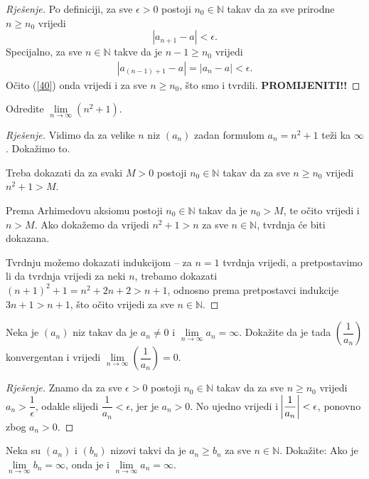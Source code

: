\begin{proof}[Rješenje]
Po definiciji, za sve $\epsilon>0$ postoji $n_0\in \mathbb{N}$ takav da za sve prirodne $n\geq n_0$ vrijedi $$|a_{n+1}-a|<\epsilon.$$ Specijalno, za sve $n\in \mathbb{N}$ takve da je $n-1\geq n_0$ vrijedi 
\begin{gather}
\label{40}
|a_{(n-1)+1}-a|=|a_n-a|<\epsilon.
\end{gather}
Očito (\ref{40}) onda vrijedi i za sve $n\geq n_0$, što smo i tvrdili. \textbf{PROMIJENITI!!}
\end{proof}
\begin{exercise}
Odredite $\lim\limits_{n\to \infty} \left(n^2+1\right)$.
\end{exercise}
\begin{proof}[Rješenje]
Vidimo da za velike $n$ niz $(a_n)$ zadan formulom $a_n=n^2+1$ teži ka $\infty$. Dokažimo to. 

Treba dokazati da za svaki $M>0$ postoji $n_0\in \mathbb{N}$ takav da za sve $n\geq n_0$ vrijedi $n^2+1>M$. 

Prema Arhimedovu aksiomu postoji $n_0\in \mathbb{N}$ takav da je $n_0>M$, te očito vrijedi i $n>M$. Ako dokažemo da vrijedi $n^2+1>n$ za sve $n\in \mathbb{N}$, tvrdnja će biti dokazana. 

Tvrdnju možemo dokazati indukcijom -- za $n=1$ tvrdnja vrijedi, a pretpostavimo li da tvrdnja vrijedi za neki $n$, trebamo dokazati $(n+1)^2+1=n^2+2n+2>n+1$, odnosno prema pretpostavci indukcije $3n+1>n+1$, što očito vrijedi za sve $n\in \mathbb{N}$.
\end{proof}
\begin{exercise}
\label{6}
Neka je $(a_n)$ niz takav da je $a_n\neq 0$ i $\lim\limits_{n\to \infty}{a_n}=\infty$. Dokažite da je tada $\left(\dfrac{1}{a_n}\right)$ konvergentan i vrijedi $\lim\limits_{n\to \infty}\left(\dfrac{1}{a_n}\right)=0$.
\end{exercise}
\begin{proof}[Rješenje]
Znamo da za sve $\epsilon>0$ postoji $n_0\in \mathbb{N}$ takav da za sve $n\geq n_0$ vrijedi $a_n>\dfrac{1}{\epsilon}$, odakle slijedi $\dfrac{1}{a_n}<\epsilon$, jer je $a_n>0$. No ujedno vrijedi i $\abs{\dfrac{1}{a_n}}<\epsilon$, ponovno zbog $a_n>0$.
\end{proof}
\begin{exercise}
\label{liminftylemma}
Neka su $(a_n)$ i $(b_n)$ nizovi takvi da je $a_n\geq b_n$ za sve $n\in \mathbb{N}$. Dokažite: Ako je $\lim\limits_{n\to \infty}{b_n}=\infty$, onda je i $\lim\limits_{n\to \infty}{a_n}=\infty$.
\end{exercise}
